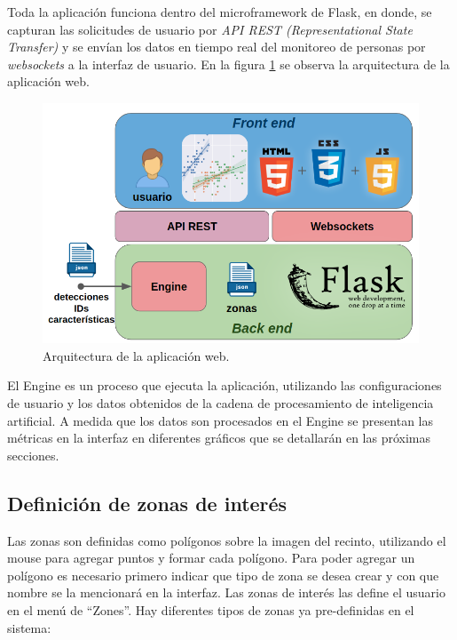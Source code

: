 Toda la aplicación funciona dentro del microframework de Flask, en donde, se capturan las solicitudes de usuario por \textit{API REST (Representational 
State Transfer)} \citep{API_REST} y se envían los datos en tiempo real del monitoreo de personas por \textit{websockets} \citep{WEBSOCKETS} a la interfaz de usuario. En la figura \ref{fig:arquitecturaWebApp} se observa la arquitectura de la aplicación web.

\begin{figure}[ht]
	\centering
	\includegraphics[scale=.6]{./Figures/arquitecturaWebApp.png}
	\caption{Arquitectura de la aplicación web.}
	\label{fig:arquitecturaWebApp}
\end{figure}

El Engine es un proceso que ejecuta la aplicación, utilizando las configuraciones de usuario y los datos obtenidos de la cadena de procesamiento de inteligencia artificial. A medida que los datos son procesados en el Engine se presentan las métricas en la interfaz en diferentes gráficos que se detallarán en las próximas secciones.

\newpage

\subsection{Definición de zonas de interés}

Las zonas son definidas como polígonos sobre la imagen del recinto, utilizando el mouse para agregar puntos y formar cada polígono. Para poder agregar un polígono es necesario primero indicar que tipo de zona se desea crear y con que nombre se la mencionará en la interfaz. Las zonas de interés las define el usuario en el menú de ``Zones''. Hay diferentes tipos de zonas ya pre-definidas en el sistema:

